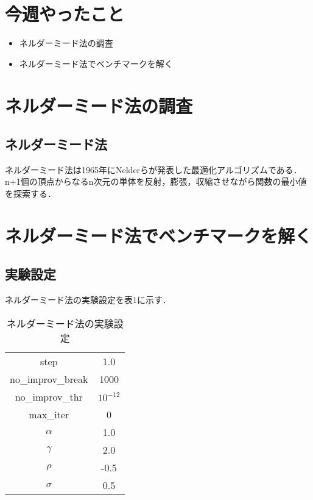 \documentclass[twocolumn]{jarticle}
\begin{document}


\section{今週やったこと}
\begin{itemize}
  \item ネルダーミード法の調査
  \item ネルダーミード法でベンチマークを解く
\end{itemize}


\section{ネルダーミード法の調査}
	\subsection{ネルダーミード法}
	ネルダーミード法\cite{10.1093/comjnl/7.4.308}は1965年にNelderらが発表した最適化アルゴリズムである．n+1個の頂点からなるn次元の単体を反射，膨張，収縮させながら関数の最小値を探索する．
	
\section{ネルダーミード法でベンチマークを解く}
	\subsection{実験設定}
	ネルダーミード法の実験設定を表1に示す．
	\begin{table}[htbp]
		\begin{center}
			\caption{ネルダーミード法の実験設定}
			\begin{tabular}{| c | c |} \hline
				step & 1.0 \\
				no\_improv\_break & 1000 \\
				no\_improv\_thr & $10^{-12}$ \\ 
				max\_iter & 0 \\
 				$\alpha$ & 1.0 \\
				$\gamma$ & 2.0 \\
				$\rho$ & -0.5 \\
				$\sigma$ & 0.5 \\ \hline
				
			\end{tabular}
		\end{center}
	\end{table}
	
\end{document}
